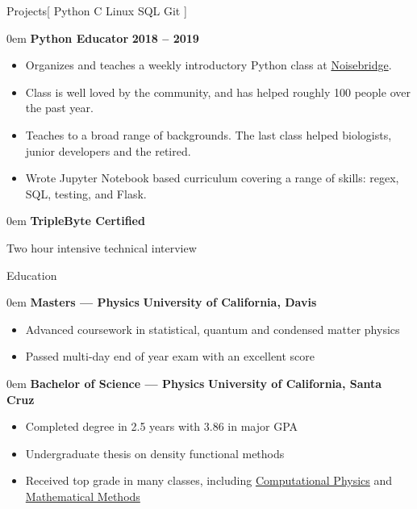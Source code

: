 \documentclass[11pt,a4paper]{article}
\newenvironment{headedsection}[2]{
    \begin{addmargin}[0.5em]{0em}
    {\large\bfseries #1} \hfill {\bfseries #2}%
    \begin{itemize}
        [label={}, topsep=0pt, itemsep=1.5pt, parsep=0pt, leftmargin=1.5em]
}{
    \end{itemize}
    \end{addmargin}
    \medskip
}
\begin{document}
\begin{mysection}{Projects}[
    Python \textbullet{} C \textbullet{} Linux \textbullet{} SQL \textbullet{} Git
]

    \begin{headedsection}{Python Educator}{2018 -- 2019}
        \item Organizes and teaches a weekly introductory Python class at \href{https://www.noisebridge.net/}{Noisebridge}.
        \item Class is well loved by the community, and has helped roughly 100 people over the past year.
        \item Teaches to a broad range of backgrounds.  The last class helped biologists, junior developers and the retired.
        \item Wrote Jupyter Notebook based curriculum covering a range of skills: regex, SQL, testing, and Flask.
    \end{headedsection}

    \begin{headedsection}{TripleByte Certified}
        \item Two hour intensive technical interview
    \end{headedsection}
\end{mysection}

\begin{mysection}{Education}
    \begin{headedsection}{Masters --- Physics}
          {University of California, Davis}

        \item Advanced coursework in statistical, quantum and condensed matter
            physics
        \item Passed multi-day end of year exam with an excellent score
    \end{headedsection}

    \begin{headedsection}{Bachelor of Science --- Physics}
          {University of California, Santa Cruz}

        \item Completed degree in 2.5 years with 3.86 in major GPA
        \item Undergraduate thesis on density functional methods
        \item Received top grade in many classes, including 
            \href{http://young.physics.ucsc.edu/115/}{Computational Physics}
            and
            \href{http://scipp.ucsc.edu/~haber/ph116C/}{Mathematical Methods}
    \end{headedsection}
\end{mysection}
\end{document}
